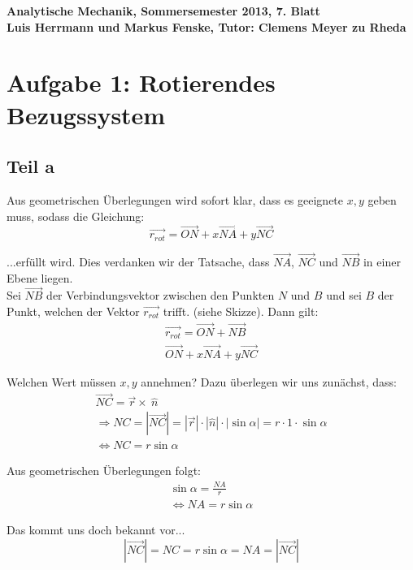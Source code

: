 \documentclass[a4paper,german,12pt,smallheadings]{scrartcl}
\begin{document}
\begin{center}
\bfseries %
\sffamily %
\vspace{-40pt}
Analytische Mechanik, Sommersemester 2013, 7. Blatt \\
Luis Herrmann und Markus Fenske, Tutor: Clemens Meyer zu Rheda
\vspace{-10pt}
\end{center}
\section*{Aufgabe 1: Rotierendes Bezugssystem}
\subsection*{Teil a}

Aus geometrischen Überlegungen wird sofort klar, dass es geeignete $x,y$ geben muss, sodass die Gleichung:
\begin{equation*}
\vec{r_ {rot}}=\vec{ON}+x\vec{NA}+y\vec{NC}
\end{equation*}

...erfüllt wird. Dies verdanken wir der Tatsache, dass $\vec{NA}$, $\vec{NC}$ und $\vec{NB}$ in einer Ebene liegen.\\
Sei $\vec{NB}$ der Verbindungsvektor zwischen den Punkten $N$ und $B$ und sei $B$ der Punkt, welchen der Vektor $\vec{r_{rot}}$ trifft. (siehe Skizze). Dann gilt:
\begin{align*}
\vec{r_{rot}}=\vec{ON}+\vec{NB}\\
\vec{ON}+x\vec{NA}+y\vec{NC}
\end{align*}

Welchen Wert müssen $x,y$ annehmen? Dazu überlegen wir uns zunächst, dass:
\begin{align*}
\vec{NC}=\vec{r}\times\ \hat{n}\\
\Rightarrow NC=|\vec{NC}|=|\vec{r}| \cdot |\hat{n}| \cdot |\sin \alpha|=r\cdot 1 \cdot\sin\alpha\\
\Leftrightarrow NC=r\sin\alpha
\end{align*}

Aus geometrischen Überlegungen folgt:
\begin{align*}
\sin\alpha=\frac{{NA}}{r}\\
\Leftrightarrow {NA}=r\sin\alpha
\end{align*}

Das kommt uns doch bekannt vor...
\begin{equation*}
|\vec{NC}|=NC=r\sin\alpha=NA=|\vec{NC}|
\end{equation*}
\end{document}
